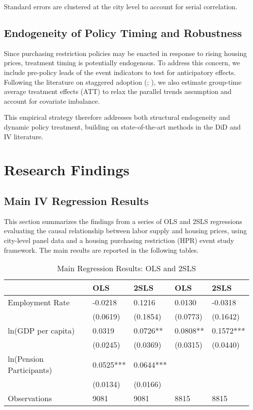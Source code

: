 \documentclass[12pt,english]{article}
\begin{document}
	Standard errors are clustered at the city level to account for serial correlation.
	
	\subsection{Endogeneity of Policy Timing and Robustness}
	
	Since purchasing restriction policies may be enacted in response to rising housing prices, treatment timing is potentially endogenous. To address this concern, we include pre-policy leads of the event indicators to test for anticipatory effects. Following the literature on staggered adoption (\citealp{sun2021estimating}; \citealp{callaway2021difference}), we also estimate group-time average treatment effects (ATT) to relax the parallel trends assumption and account for covariate imbalance.
	
	\vspace{1em}
	This empirical strategy therefore addresses both structural endogeneity and dynamic policy treatment, building on state-of-the-art methods in the DiD and IV literature.
	
	\section{Research Findings}\label{sec:results}
	
	\subsection{Main IV Regression Results}
	This section summarizes the findings from a series of OLS and 2SLS regressions evaluating the causal relationship between labor supply and housing prices, using city-level panel data and a housing purchasing restriction (HPR) event study framework. The main results are reported in the following tables.
	\begin{table}[H]
		\centering
		\caption{Main Regression Results: OLS and 2SLS}
		\label{tab:main_results}
		\begin{tabular}{lllll}
			\toprule
			&        OLS &               2SLS &  OLS &  2SLS \\
			\midrule
			Employment Rate &   -0.0218 &    0.1216 &   0.0130 &   -0.0318 \\
			& (0.0619) & (0.1854) & (0.0773) & (0.1642) \\
			ln(GDP per capita) &    0.0319 &  0.0726** & 0.0808** & 0.1572*** \\
			& (0.0245) & (0.0369) & (0.0315) & (0.0440) \\
			ln(Pension Participants) & 0.0525*** & 0.0644*** &                   &                    \\
			& (0.0134) & (0.0166) &                   &                    \\
			Observations &               9081 &                9081 &              8815 &                8815 \\
			\bottomrule
		\end{tabular}
	\end{table}
	
\end{document}
